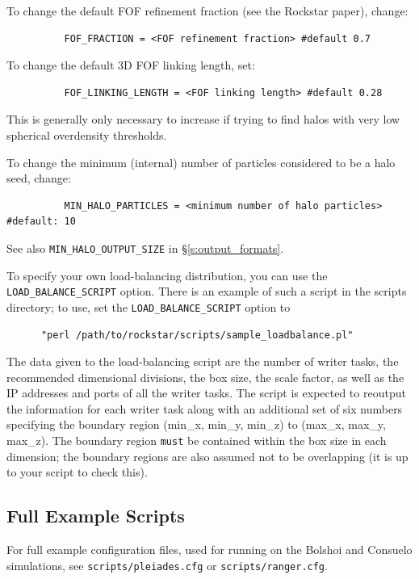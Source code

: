 \documentclass[12pt]{article}
\begin{document}
      To change the default FOF refinement fraction (see the Rockstar paper),
      change:
\begin{verbatim}
          FOF_FRACTION = <FOF refinement fraction> #default 0.7
\end{verbatim}
      To change the default 3D FOF linking length, set:
\begin{verbatim}
          FOF_LINKING_LENGTH = <FOF linking length> #default 0.28
\end{verbatim}
	This is generally only necessary to increase if trying to find halos with very low spherical overdensity thresholds.

      To change the minimum (internal) number of particles considered to be
      a halo seed, change:
\begin{verbatim}
          MIN_HALO_PARTICLES = <minimum number of halo particles> #default: 10
\end{verbatim}

      See also \texttt{MIN\_HALO\_OUTPUT\_SIZE} in \S \ref{s:output_formats}.


      To specify your own load-balancing distribution, you can use the
      \texttt{LOAD\_BALANCE\_SCRIPT} option.  There is an example of such a script in
      the scripts directory; to use, set the \texttt{LOAD\_BALANCE\_SCRIPT} option to
      \begin{verbatim}
      "perl /path/to/rockstar/scripts/sample_loadbalance.pl"
      \end{verbatim}
      The data given to the load-balancing script are the number of writer tasks,
      the recommended dimensional divisions,
      the box size, the scale factor, as well as the IP addresses and ports
      of all the writer tasks.  The script is expected to reoutput the
      information for each writer task along with an additional set of six
      numbers specifying the boundary region (min\_x, min\_y, min\_z) to
      (max\_x, max\_y, max\_z).  The boundary region \texttt{must} be contained within
      the box size in each dimension; the boundary regions are also assumed not to
      be overlapping (it is up to your script to check this).

\subsection{Full Example Scripts}
\label{s:full_example_scripts}
      For full example configuration files, used for running on the Bolshoi
      and Consuelo simulations, see \texttt{scripts/pleiades.cfg} or \texttt{scripts/ranger.cfg}.
\end{document}
